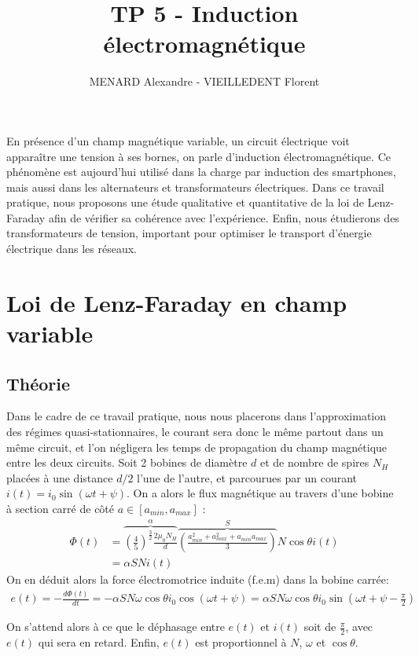 \documentclass[11pt]{article}
\title{\vspace{-2cm}\textbf{TP 5 - Induction électromagnétique}}
\author{\vspace{-0.5cm}MENARD Alexandre - VIEILLEDENT Florent}
\date{\vspace{-0.7cm}}
\begin{document}
\maketitle

En présence d'un champ magnétique variable, un circuit électrique voit apparaître une tension à ses bornes, on parle d'induction électromagnétique.
Ce phénomène est aujourd'hui utilisé dans la charge par induction des smartphones, mais aussi dans les alternateurs et transformateurs électriques.
Dans ce travail pratique, nous proposons une étude qualitative et quantitative de la loi de Lenz-Faraday afin de vérifier sa cohérence avec l'expérience. 
Enfin, nous étudierons des transformateurs de tension, important pour optimiser le transport d'énergie électrique dans les réseaux.

\section{Loi de Lenz-Faraday en champ variable}
\subsection{Théorie}
Dans le cadre de ce travail pratique, nous nous placerons dans l'approximation des régimes quasi-stationnaires, le courant
sera donc le même partout dans un même circuit, et l'on négligera les temps de propagation du champ magnétique entre les deux circuits.
Soit 2 bobines de diamètre $d$ et de nombre de spires $N_H$ placées à une distance $d/2$ l'une de l'autre, et parcourues par un courant $i(t) = i_0\sin(\omega t + \psi)$.	
On a alors le flux magnétique au travers d'une bobine à section carré de côté $a \in [a_{min}, a_{max}]$ :
\begin{align}
    \label{eqn:relation_1}
    \Phi(t) & = \overbrace{\left(\frac{4}{5} \right)^{\frac{3}{2}} \frac{2\mu_0 N_H}{d}}^{\alpha} \overbrace{\left(\frac{a_{min}^2 + a_{max}^2 + a_{min}a_{max}}{3}\right)}^{S} N \cos \theta i(t) \nonumber\\
    & = \alpha S N i(t)
\end{align}
On en déduit alors la force électromotrice induite (f.e.m) dans la bobine carrée:
\begin{align}
    e(t) = -\frac{d\Phi(t)}{dt} = -\alpha S N \omega \cos \theta i_0 \cos (\omega t + \psi) = \alpha S N \omega \cos \theta i_0 \sin (\omega t + \psi - \frac{\pi}{2})
\end{align}

On s'attend alors à ce que le déphasage entre $e(t)$ et $i(t)$ soit de $\frac{\pi}{2}$, avec $e(t)$ qui sera en retard. Enfin, $e(t)$ est proportionnel
à $N$, $\omega$ et $\cos \theta$.
\end{document}
